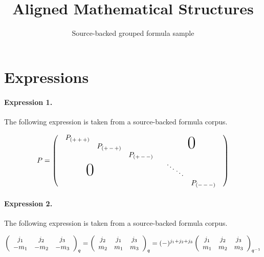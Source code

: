 \documentclass[11pt]{article}
\title{Aligned Mathematical Structures}
\author{Source-backed grouped formula sample}
\date{}
\begin{document}
\maketitle
\section{Expressions}
\paragraph{Expression 1.} The following expression is taken from a source-backed formula corpus.

\begin{align*}P = \left( \begin{array}{cc}\begin{array}{ccc}P_{(+\,+\,+)} & & \\ &P_{(+\,-\,+)} & \\ & &P_{(+\,-\,-)}\end{array} & \text{\Huge 0} \\\hspace*{-19mm} \text{\Huge 0} &\begin{array}{ccc}\vspace*{-3.5mm}\hspace*{-0.5mm}\ddots & & \\ &\hspace*{-3.1mm} \ddots & \\ & &P_{(-\,-\,-)}\end{array}\end{array} \right)\end{align*}

\paragraph{Expression 2.} The following expression is taken from a source-backed formula corpus.

\begin{align*}\left(\begin{array} {c c c}j_{1}& j_{2}& j_{3}\\-m_{1}& -m_{2}& -m_{3}\\\end{array}\right)_{q}=\left(\begin{array} {c c c}j_{2}& j_{1}& j_{3}\\m_{2}& m_{1}& m_{3}\\\end{array}\right)_{q}=(-)^{j_{1}+j_{2}+j_{3}}\left(\begin{array} {c c c}j_{1}& j_{2}& j_{3}\\m_{1}& m_{2}& m_{3}\\\end{array}\right)_{q^{-1}}\end{align*}
\end{document}
